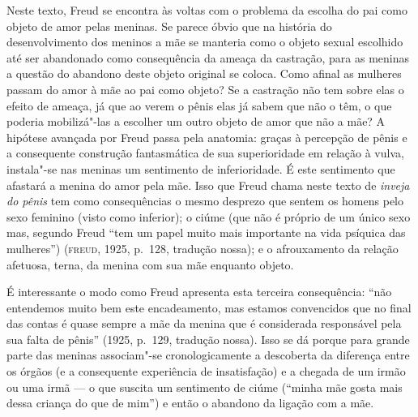 Neste texto, Freud se encontra às voltas com o problema da escolha do
pai como objeto de amor pelas meninas. Se parece óbvio que na história
do desenvolvimento dos meninos a mãe se manteria como o objeto sexual
escolhido até ser abandonado como consequência da ameaça da castração,
para as meninas a questão do abandono deste objeto original se coloca.
Como afinal as mulheres passam do amor à mãe ao pai como objeto? Se a
castração não tem sobre elas o efeito de ameaça, já que ao verem o pênis
elas já sabem que não o têm, o que poderia mobilizá"-las a escolher um
outro objeto de amor que não a mãe? A hipótese avançada por Freud passa
pela anatomia: graças à percepção de pênis e a consequente construção
fantasmática de sua superioridade em relação à vulva, instala"-se nas
meninas um sentimento de inferioridade. É este sentimento que afastará a
menina do amor pela mãe. Isso que Freud chama neste texto de
\emph{inveja do pênis} tem como consequências o mesmo desprezo que
sentem os homens pelo sexo feminino (visto como inferior); o ciúme (que
não é próprio de um único sexo mas, segundo Freud ``tem um papel muito
mais importante na vida psíquica das mulheres'') (\textsc{freud}, 1925, p.~128, tradução nossa); e o afrouxamento da relação afetuosa, terna, da menina com sua mãe enquanto
objeto.

É interessante o modo como Freud apresenta esta terceira consequência:
``não entendemos muito bem este encadeamento, mas estamos convencidos
que no final das contas é quase sempre a mãe da menina que é considerada
responsável pela sua falta de pênis'' (1925, p.~129, tradução nossa). Isso se dá porque para
grande parte das meninas associam"-se cronologicamente a descoberta da
diferença entre os órgãos (e a consequente experiência de insatisfação)
e a chegada de um irmão ou uma irmã --- o que suscita um sentimento de
ciúme (``minha mãe gosta mais dessa criança do que de mim'') e então o
abandono da ligação com a mãe.

